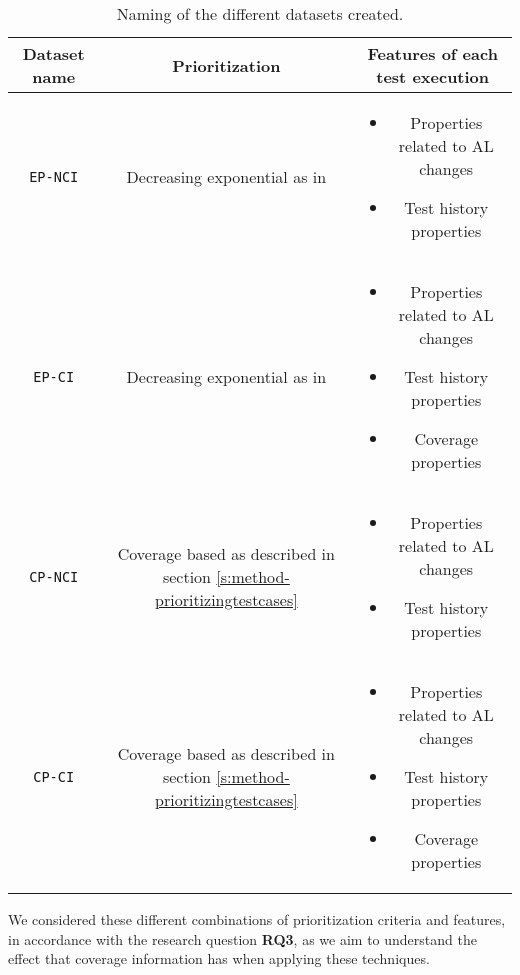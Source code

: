 \begin{table}[h!]
    \centering
    {\renewcommand{\arraystretch}{2.5}
    \begin{tabular}{|c|c|c|}
        \hline
        \textbf{Dataset name} & \textbf{Prioritization} & \textbf{Features of each test execution} \\
        \hline
        \parbox{0.12\textwidth}{\texttt{EP-NCI}} & \parbox{0.30\textwidth}{Decreasing exponential as in \cite{Bertolino2020LearningtoRankVR}} & \parbox{0.40\textwidth}{
            \begin{itemize}
                \item Properties related to AL changes
                \item Test history properties
            \end{itemize}
        } \\
        \hline
        \parbox{0.12\textwidth}{\texttt{EP-CI}} & \parbox{0.30\textwidth}{Decreasing exponential as in \cite{Bertolino2020LearningtoRankVR}} & \parbox{0.40\textwidth}{
            \begin{itemize}
                \item Properties related to AL changes
                \item Test history properties
                \item Coverage properties
            \end{itemize}
        } \\
        \hline
        \parbox{0.12\textwidth}{\texttt{CP-NCI}} & \parbox{0.30\textwidth}{Coverage based as described in section \ref{s:method-prioritizingtestcases}} & \parbox{0.40\textwidth}{
            \begin{itemize}
                \item Properties related to AL changes
                \item Test history properties
            \end{itemize}
        } \\
        \hline
        \parbox{0.12\textwidth}{\texttt{CP-CI}} & \parbox{0.30\textwidth}{Coverage based as described in section \ref{s:method-prioritizingtestcases}} & \parbox{0.40\textwidth}{
            \begin{itemize}
                \item Properties related to AL changes
                \item Test history properties
                \item Coverage properties
            \end{itemize}
        } \\
        \hline
    \end{tabular} }
    \caption{Naming of the different datasets created.}
    \label{f:table-naming-datasets}
\end{table}

We considered these different combinations of prioritization criteria and features, in accordance with
the research question \textbf{RQ3}, as we aim to understand the effect that coverage information has 
when applying these techniques.
